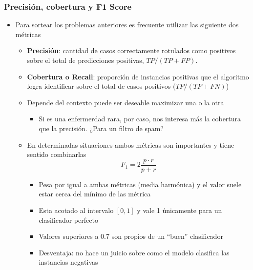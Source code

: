 \documentclass[leqno, 10pt, envcountsect]{beamer}
\numberwithin{equation}{section}
\theoremstyle{definition}
\theoremstyle{example}
\numberwithin{figure}{section}
\numberwithin{table}{section}
\let\olditem\item
\renewcommand{\item}{%
\olditem\vspace{1pt}}
\begin{document}
\begin{frame}
  \frametitle{Precisión, cobertura y F1 Score}
  \begin{itemize}
    \item Para sortear los problemas anteriores es frecuente utilizar las
      siguiente dos métricas
      \begin{itemize}
        \item \textbf{Precisión}: cantidad de casos correctamente rotulados
          como positivos sobre el total de predicciones positivas, $TP / (TP +
          FP)$.
        \item \textbf{Cobertura o Recall}: proporción de instancias positivas
          que el algoritmo logra identificar sobre el total de casos positivos
          ($TP / (TP + FN)$)
        \item Depende del contexto puede ser deseable maximizar una o la otra
          \begin{itemize}
            \item Si es una enfermerdad rara, por caso, nos interesa más la
              cobertura que la precisión. ¿Para un filtro de spam?
          \end{itemize}
      \end{itemize}
      \begin{itemize}
        \item En determinadas situaciones ambos métricas son importantes y
          tiene sentido combinarlas
          \begin{equation*}
            F_{1} = 2\frac{p\cdot r}{p + r}
          \end{equation*}
          \begin{itemize}
            \item Pesa por igual a ambas métricas (media harmónica) y el
              valor suele estar cerca del mínimo de las métrica
            \item Esta acotado al intervalo $[0, 1]$ y vale 1 únicamente para
              un clasificador perfecto
            \item Valores superiores a 0.7 son propios de un \enquote{buen}
              clasificador
            \item Desventaja: no hace un juicio sobre como el modelo clasifica
              las instancias negativas
          \end{itemize}
      \end{itemize}
  \end{itemize}
\end{frame}
\end{document}
